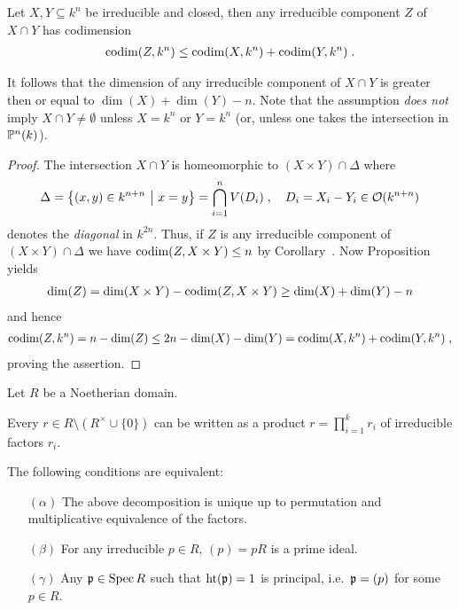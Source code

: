 \documentclass[a4paper,parskip=half,numbers=enddot, DIV=12, headheight=30pt]{scrreprt}
\begin{document}
\begin{thm}
    Let $X,Y\subseteq k^n$ be irreducible and closed, then any irreducible component $Z$ of $X\cap Y$ has codimension 
    \begin{align*}
    	\operatorname{codim}(Z,k^n)\leq\operatorname{codim}(X,k^n) +\operatorname{codim}(Y,k^n)\;.
    \end{align*}
\end{thm}
\begin{rem*}
    It follows that the dimension of any irreducible component of $X\cap Y$ is greater then or equal to $\dim (X)+\dim (Y) -n$. Note that the assumption \emph{does not} imply $X\cap Y \not= \emptyset$ unless $X=k^n$ or $Y=k^n$ (or, unless one takes the intersection in $\mathbb{P}^n(k)$).
\end{rem*}
\begin{proof}
    The intersection $X\cap Y$ is homeomorphic to $(X\times Y)\cap \Delta$ where 
    \begin{align*}
    	\Delta = \left\{(x,y)\in k^{n+n}\ \middle|\  x=y\right\} = \bigcap_{i=1}^n V(D_i)\;,\quad D_i = X_i -Y_i \in \mathcal{O}(k^{n+n})
    \end{align*}
    denotes the \emph{diagonal} in $k^{2n}$. Thus, if $Z$ is any irreducible component of $(X\times Y)\cap \Delta$ we have $\operatorname{codim}(Z,X\times Y) \leq n$ by Corollary~.  Now Proposition~ yields
    \begin{align*}
	    \dim(Z) = \dim(X\times Y) -\operatorname{codim}(Z,X\times Y) \geq \dim(X)+\dim(Y) -n
    \end{align*}
   and hence
   \begin{align*}
	   	\operatorname{codim}(Z,k^n) = n-\dim(Z) \leq 2n -\dim (X) -\dim (Y) = \operatorname{codim}(X,k^n)+\operatorname{codim}(Y,k^n)\;,
   \end{align*}
   proving the assertion.
\end{proof}
\begin{thm}
 Let $R$ be a Noetherian domain. 
 \begin{alphanumerate}
    \item 
        Every $r\in R\setminus (R^\times \cup\{0\})$ can be written as a product $r = \prod_{i=1}^k r_i$ of irreducible factors $r_i$. 
    \item 
        The following conditions are equivalent:
        \begin{itemize}
            \item[$(\alpha)$]
                The above decomposition is unique up to permutation and multiplicative equivalence of the factors.
            \item[$(\beta)$]
                For any irreducible $p\in R$, $(p)=pR$ is a prime ideal.
            \item[$(\gamma)$]
                Any $\mathfrak{p}\in\operatorname{Spec} R$ such that $\operatorname{ht}(\mathfrak{p}) = 1$ is principal, i.e.\ $\mathfrak{p} = (p)$ for some $p\in R$.
        \end{itemize}
 \end{alphanumerate}
\end{thm}
\end{document}
